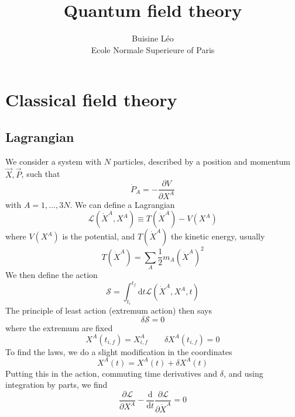 \documentclass[a4paper]{book}
\theoremstyle{definition}
\theoremstyle{remark}
\begin{document}
\title{Quantum field theory}
\author{Buisine Léo\\Ecole Normale Superieure of Paris}
\maketitle

\tableofcontents

\chapter{Classical field theory}
\section{Lagrangian}
We consider a system with $N$ particles, described by a position and momentum $\vec{X}, \vec{P}$, such that 
\begin{equation}
    \dot{P}_A = -\frac{\partial V}{\partial X^A}
\end{equation}
with $A = 1, \dots, 3N$. We can define a Lagrangian
\begin{equation}
    \mathcal{L}(\dot{X}^A, X^A) \equiv T(\dot{X}^A) - V(X^A)
\end{equation}
where $ V(X^A)$ is the potential, and $T(\dot{X}^A)$ the kinetic energy, usually 
\begin{equation}
    T(\dot{X}^A) = \sum_A \frac{1}{2}m_A (\dot{X}^A)^2
\end{equation}
We then define the action 
\begin{equation}
    \mathcal{S} = \int_{t_i }^{t_f }\text{d}t \mathcal{L}(\dot{X}^A, X^A, t)
\end{equation}
The principle of least action (extremum action) then says 
\begin{equation}
    \delta \mathcal{S} = 0
\end{equation}
where the extremum are fixed 
\begin{equation}
    X^A(t_{i,f}) = X^A_{i, f} \qquad \delta X^A(t_{i,f}) = 0
\end{equation}
To find the laws, we do a slight modification in the coordinates 
\begin{equation}
    X^A(t) = X^A(t) + \delta X^A(t)
\end{equation}
Putting this in the action, commuting time derivatives and $\delta$, and using integration by parts, we find 
\begin{equation}
    \frac{\partial \mathcal{L}}{\partial X^A} - \frac{\text{d}}{\text{d}t} \frac{\partial \mathcal{L}}{\partial \dot{X}^A} = 0
\end{equation}
\end{document}
